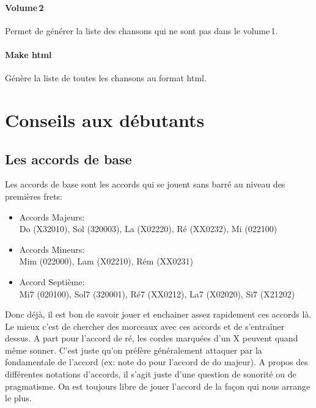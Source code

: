 \documentclass[a4paper,twoside]{article}
\begin{document}
\paragraph{Volume\,2}
Permet de générer la liste des chansons qui ne sont pas dans le volume\,1.

\paragraph{Make html}
Génère la liste de toutes les chansons au format html.


\section{Conseils aux débutants}

\subsection{Les accords de base}

Les accords de base sont les accords qui se jouent sans barré au
niveau des premières frets:

\begin{itemize}
\item Accords Majeurs:\\ 
  Do (X32010), Sol (320003), La (X02220), Ré (XX0232), Mi (022100)\\
\item Accords Mineurs:\\
  Mim (022000), Lam (X02210), Rém (XX0231)\\
\item Accord Septième:\\
  Mi7 (020100), Sol7 (320001), Ré7 (XX0212), La7 (X02020), Si7 (X21202)\\
\end{itemize}

Donc déjà, il est bon de savoir jouer et enchainer assez rapidement
ces accords là. Le mieux c'est de chercher des morceaux avec ces
accords et de s'entraîner dessus.  A part pour l'accord de ré, les
cordes marquées d'un X peuvent quand même sonner.  C'est juste qu'on
préfère généralement attaquer par la fondamentale de l'accord (ex:
note do pour l'accord de do majeur).  A propos des différentes
notations d'accords, il s'agit juste d'une question de sonorité ou de
pragmatisme. On est toujours libre de jouer l'accord de la façon qui
nous arrange le plus.
\end{document}
